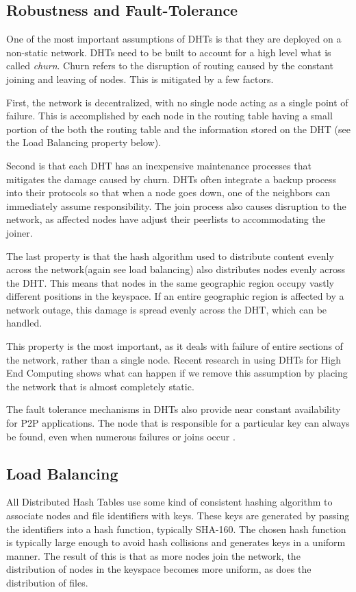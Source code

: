 \documentclass[10pt,letterpaper,twoside]{report}
\begin{document}
\subsection{Robustness and Fault-Tolerance}
\label{subsec:ft}
One of the most important assumptions of DHTs is that they are deployed on a non-static network.
DHTs need to be built to account for a high level what is called \textit{churn}.  
Churn refers to the disruption of routing caused by the constant joining and leaving of nodes.
This is mitigated by a few factors.

First, the network is decentralized, with no single node acting as a single point of failure.
This is accomplished by each node in the routing table having a small portion of the both the routing table and the information stored on the DHT (see the Load Balancing property below).

Second is that each DHT has an inexpensive maintenance processes that mitigates the damage caused by churn.
DHTs often integrate a backup process into their protocols so that when a node goes down, one of the neighbors can immediately assume responsibility.
The join process also causes disruption to the network, as affected nodes have adjust their peerlists to accommodating the joiner. 

The last property is that the hash algorithm used to distribute content evenly across the network(again see load balancing) also distributes nodes evenly across the DHT.  
This means that nodes in the same geographic region occupy vastly different positions in the keyspace.  
If an entire geographic region is affected by a network outage, this damage is spread evenly across the DHT, which can be handled.

This property is the most important, as it deals with failure of entire sections of the network, rather than a single node.
Recent research in using DHTs for High End Computing \cite{li2013zht} shows what can happen if we remove this assumption by placing the network that is almost completely static.

The fault tolerance mechanisms in DHTs also provide near constant availability for P2P applications.
The node that is responsible for a particular key can always be found, even when numerous failures or joins occur \cite{chord}.

\subsection{Load Balancing}
\label{subsec:lb}
All Distributed Hash Tables use some kind of consistent hashing algorithm to associate nodes and file identifiers with keys.  
These keys are generated by passing the identifiers into a hash function, typically SHA-160.
The chosen hash function is typically large enough to avoid hash collisions and generates keys in a uniform manner. 
The result of this is that as more nodes join the network, the distribution of nodes in the keyspace becomes more uniform, as does the distribution of files.
\end{document}
